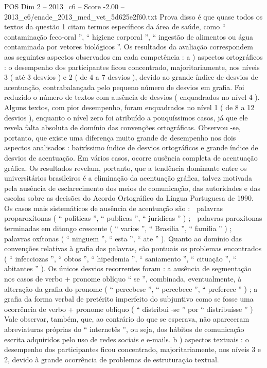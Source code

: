 \begin{textsample}{POS Dim 2 – 2013\_c6 – Score -2.00 – 2013\_c6/enade\_2013\_med\_vet\_5d625e2f60.txt}
Prova disso é que quase todos os textos da questão 1 citam termos específicos da área de saúde, como “ contaminação feco-oral ”, “ higiene corporal ”, “ ingestão de alimentos ou água contaminada por vetores biológicos ”.
Os resultados da avaliação correspondem aos seguintes aspectos observados em cada competência : a ) aspectos ortográficos : o desempenho dos participantes ficou concentrado, majoritariamente, nos níveis 3 ( até 3 desvios ) e 2 ( de 4 a 7 desvios ), devido ao grande índice de desvios de acentuação, contrabalançada pelo pequeno número de desvios em grafia.
Foi reduzido o número de textos com ausência de desvios ( enquadrados no nível 4 ).
Alguns textos, com pior desempenho, foram enquadrados no nível 1 ( de 8 a 12 desvios ), enquanto o nível zero foi atribuído a pouquíssimos casos, já que ele revela falta absoluta de domínio das convenções ortográficas.
Observou -se, portanto, que existe uma diferença muito grande de desempenho nos dois aspectos analisados : baixíssimo índice de desvios ortográficos e grande índice de desvios de acentuação.
Em vários casos, ocorre ausência completa de acentuação gráfica.
Os resultados revelam, portanto, que a tendência dominante entre os universitários brasileiros é a eliminação da acentuação gráfica, talvez motivada pela ausência de esclarecimento dos meios de comunicação, das autoridades e das escolas sobre as decisões do Acordo Ortográfico da Língua Portuguesa de 1990.
Os casos mais sistemáticos de ausência de acentuação são :  palavras proparoxítonas ( “ politicas ”, “ publicas ”, “ juridicas ” ) ;  palavras paroxítonas terminadas em ditongo crescente ( “ varios ”, “ Brasilia ”, “ familia ” ) ;  palavras oxítonas ( “ ninguem ”, “ esta ”, “ ate ” ).
Quanto ao domínio das convenções relativas à grafia das palavras, são pontuais os problemas encontrados ( “ infecciozas ”, “ obtos ”, “ hipedemia ”, “ saniamento ”, “ cituação ”, “ abitantes ” ).
Os únicos desvios recorrentes foram : a ausência de segmentação nos casos de verbo + pronome oblíquo “ se ”, combinada, eventualmente, à alteração da grafia do pronome ( “ percebese ”, “ percebece ”, “ preferece ” ) ; a grafia da forma verbal de pretérito imperfeito do subjuntivo como se fosse uma ocorrência de verbo + pronome oblíquo ( “ distribui -se ” por “ distribuísse ” ) Vale observar, também, que, ao contrário do que se esperava, não apareceram abreviaturas próprias do “ internetês ”, ou seja, dos hábitos de comunicação escrita adquiridos pelo uso de redes sociais e e-mails. b ) aspectos textuais : o desempenho dos participantes ficou concentrado, majoritariamente, nos níveis 3 e 2, devido à grande ocorrência de problemas de estruturação textual.

\end{textsample}
